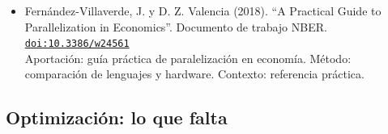 \documentclass[11pt]{article}
\begin{document}
\begin{itemize}
Aportación: resolver equilibrios dinámicos con GPU. Método: numérico. Contexto: justifica llevar tus corridas a GPU.
\item Fernández-Villaverde, J. y D. Z. Valencia (2018). ``A Practical Guide to Parallelization in Economics''. Documento de trabajo NBER. \href{https://doi.org/10.3386/w24561}{\texttt{doi:10.3386/w24561}}\\
Aportación: guía práctica de paralelización en economía. Método: comparación de lenguajes y hardware. Contexto: referencia práctica.
\end{itemize}

\subsection*{Optimización: lo que falta}
\end{document}
